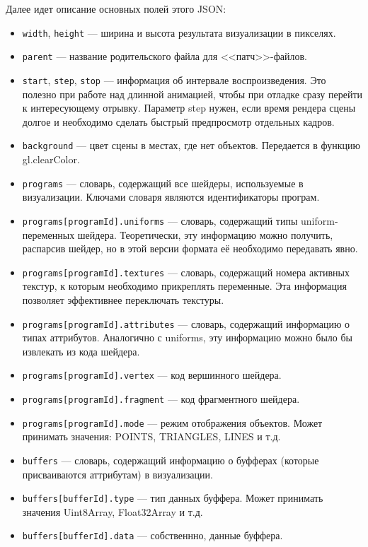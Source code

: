 Далее идет описание основных полей этого JSON:

\begin{itemize}
\item \texttt{width}, \texttt{height} --- ширина и высота результата визуализации в пикселях.
\item \texttt{parent} --- название родительского файла для <<патч>>-файлов.
\item \texttt{start}, \texttt{step}, \texttt{stop} --- информация об интервале воспроизведения. Это полезно при работе над длинной анимацией, чтобы при отладке сразу перейти к интересующему отрывку. Параметр step нужен, если время рендера сцены долгое и необходимо сделать быстрый предпросмотр отдельных кадров.
\item \texttt{background} --- цвет сцены в местах, где нет объектов. Передается в функцию gl.clearColor.
\item \texttt{programs} --- словарь, содержащий все шейдеры, используемые в визуализации. Ключами словаря являются идентификаторы програм.
\item \texttt{programs[programId].uniforms} --- словарь, содержащий типы uniform-переменных шейдера. Теоретически, эту информацию можно получить, распарсив шейдер, но в этой версии формата её необходимо передавать явно.
\item \texttt{programs[programId].textures} --- словарь, содержащий номера активных текстур, к которым необходимо прикреплять переменные. Эта информация позволяет эффективнее переключать текстуры.
\item \texttt{programs[programId].attributes} --- словарь, содержащий информацию о типах аттрибутов. Аналогично с uniforms, эту информацию можно было бы извлекать из кода шейдера.
\item \texttt{programs[programId].vertex} --- код вершинного шейдера.
\item \texttt{programs[programId].fragment} --- код фрагментного шейдера.
\item \texttt{programs[programId].mode} --- режим отображения объектов. Может принимать значения: POINTS, TRIANGLES, LINES и т.д.
\item \texttt{buffers} --- словарь, содержащий информацию о буфферах (которые присваиваются аттрибутам) в визуализации.
\item \texttt{buffers[bufferId].type} --- тип данных буффера. Может принимать значения Uint8Array, Float32Array и т.д.
\item \texttt{buffers[bufferId].data} --- собственнно, данные буффера.

\end{itemize}
